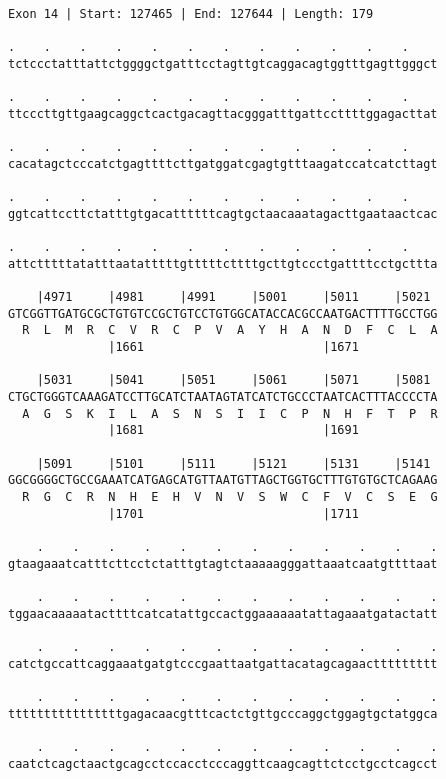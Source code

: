 \documentclass{article}
\begin{document}
\newpage
\begin{Verbatim}[fontfamily=courier]
Exon 14 | Start: 127465 | End: 127644 | Length: 179

.    .    .    .    .    .    .    .    .    .    .    .    
tctccctatttattctggggctgatttcctagttgtcaggacagtggtttgagttgggct

.    .    .    .    .    .    .    .    .    .    .    .    
ttcccttgttgaagcaggctcactgacagttacgggatttgattccttttggagacttat

.    .    .    .    .    .    .    .    .    .    .    .    
cacatagctcccatctgagttttcttgatggatcgagtgtttaagatccatcatcttagt

.    .    .    .    .    .    .    .    .    .    .    .    
ggtcattccttctatttgtgacattttttcagtgctaacaaatagacttgaataactcac

.    .    .    .    .    .    .    .    .    .    .    .    
attctttttatatttaatatttttgtttttcttttgcttgtccctgattttcctgcttta

    |4971     |4981     |4991     |5001     |5011     |5021 
GTCGGTTGATGCGCTGTGTCCGCTGTCCTGTGGCATACCACGCCAATGACTTTTGCCTGG
  R  L  M  R  C  V  R  C  P  V  A  Y  H  A  N  D  F  C  L  A
              |1661                         |1671           

    |5031     |5041     |5051     |5061     |5071     |5081 
CTGCTGGGTCAAAGATCCTTGCATCTAATAGTATCATCTGCCCTAATCACTTTACCCCTA
  A  G  S  K  I  L  A  S  N  S  I  I  C  P  N  H  F  T  P  R
              |1681                         |1691           

    |5091     |5101     |5111     |5121     |5131     |5141 
GGCGGGGCTGCCGAAATCATGAGCATGTTAATGTTAGCTGGTGCTTTGTGTGCTCAGAAG
  R  G  C  R  N  H  E  H  V  N  V  S  W  C  F  V  C  S  E  G
              |1701                         |1711           

    .    .    .    .    .    .    .    .    .    .    .    .
gtaagaaatcatttcttcctctatttgtagtctaaaaagggattaaatcaatgttttaat

    .    .    .    .    .    .    .    .    .    .    .    .
tggaacaaaaatacttttcatcatattgccactggaaaaaatattagaaatgatactatt

    .    .    .    .    .    .    .    .    .    .    .    .
catctgccattcaggaaatgatgtcccgaattaatgattacatagcagaacttttttttt

    .    .    .    .    .    .    .    .    .    .    .    .
ttttttttttttttttgagacaacgtttcactctgttgcccaggctggagtgctatggca

    .    .    .    .    .    .    .    .    .    .    .    .
caatctcagctaactgcagcctccacctcccaggttcaagcagttctcctgcctcagcct
\end{Verbatim}
\end{document}
